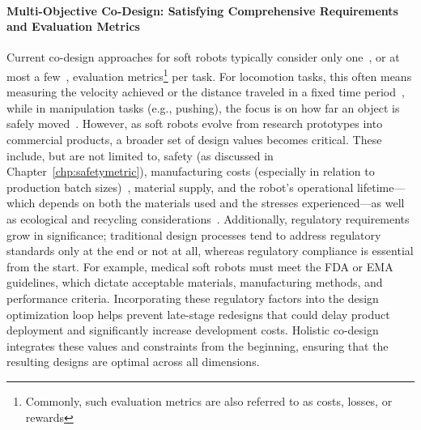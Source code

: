\paragraph{Multi-Objective Co-Design: Satisfying Comprehensive Requirements and Evaluation Metrics}
Current co-design approaches for soft robots typically consider only one~\citep{spielberg2019learning, spielberg2021co, medvet2022impact, wang2023preco, wang2024diffusebot, navez2024design}, or at most a few~\citep{navez2025modeling}, evaluation metrics\footnote{Commonly, such evaluation metrics are also referred to as costs, losses, or rewards} per task. For locomotion tasks, this often means measuring the velocity achieved or the distance traveled in a fixed time period~\citep{spielberg2019learning, wang2023preco}, while in manipulation tasks (e.g., pushing), the focus is on how far an object is safely moved~\citep{wang2024diffusebot}. However, as soft robots evolve from research prototypes into commercial products, a broader set of design values becomes critical. These include, but are not limited to, safety (as discussed in Chapter~\ref{chp:safetymetric}), manufacturing costs (especially in relation to production batch sizes)~\citep{miriyev2017soft, schmitt2018soft, majidi2014soft, junge2022leveraging}, material supply, and the robot’s operational lifetime—which depends on both the materials used and the stresses experienced—as well as ecological and recycling considerations~\citep{mazzolai2020vision}. Additionally, regulatory requirements grow in significance; traditional design processes tend to address regulatory standards only at the end or not at all, whereas regulatory compliance is essential from the start. For example, medical soft robots must meet the FDA or EMA guidelines, which dictate acceptable materials, manufacturing methods, and performance criteria. Incorporating these regulatory factors into the design optimization loop helps prevent late-stage redesigns that could delay product deployment and significantly increase development costs. Holistic co-design integrates these values and constraints from the beginning, ensuring that the resulting designs are optimal across all dimensions.

